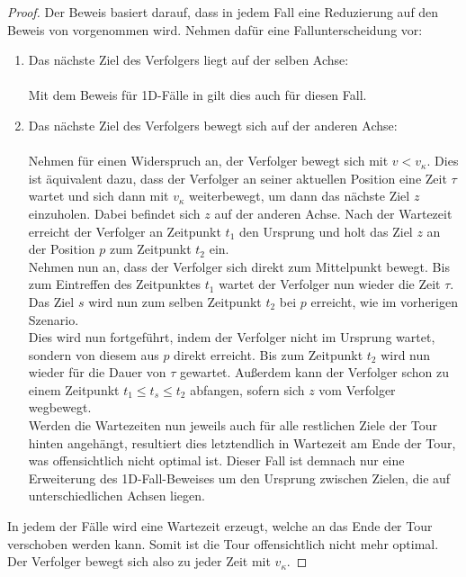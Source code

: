 \documentclass[german,version-2019-11]{uzl-thesis}
\begin{document}
\begin{proof}
Der Beweis basiert darauf, dass in jedem Fall eine Reduzierung auf den Beweis von \cite{helvig} vorgenommen wird. Nehmen dafür eine Fallunterscheidung vor:
\begin{enumerate}
\item Das nächste Ziel des Verfolgers liegt auf der selben Achse: \\\\
\noindent
Mit dem Beweis für 1D-Fälle in \cite{helvig} gilt dies auch für diesen Fall.\\

\item Das nächste Ziel des Verfolgers bewegt sich auf der anderen Achse: \\\\
\noindent
Nehmen für einen Widerspruch an, der Verfolger bewegt sich mit $v < v_{\kappa}$. Dies ist äquivalent dazu, dass der Verfolger an seiner aktuellen Position eine Zeit $\tau$ wartet und sich dann mit $v_{\kappa}$ weiterbewegt, um dann das nächste Ziel $z$ einzuholen. Dabei befindet sich $z$ auf der anderen Achse. Nach der Wartezeit erreicht der Verfolger an Zeitpunkt $t_1$ den Ursprung und holt das Ziel $z$ an der Position $p$ zum Zeitpunkt $t_2$ ein. \\
Nehmen nun an, dass der Verfolger sich direkt zum Mittelpunkt bewegt. Bis zum Eintreffen des Zeitpunktes $t_1$ wartet der Verfolger nun wieder die Zeit $\tau$. Das Ziel $s$ wird nun zum selben Zeitpunkt $t_2$ bei $p$ erreicht, wie im vorherigen Szenario. \\
Dies wird nun fortgeführt, indem der Verfolger nicht im Ursprung wartet, sondern von diesem aus $p$ direkt erreicht. Bis zum Zeitpunkt $t_2$ wird nun wieder für die Dauer von $\tau$ gewartet. Außerdem kann der Verfolger schon zu einem Zeitpunkt $t_1 \leq t_{s} \leq t_2$ abfangen, sofern sich $z$ vom Verfolger wegbewegt. \\
Werden die Wartezeiten nun jeweils auch für alle restlichen Ziele der Tour hinten angehängt, resultiert dies letztendlich in Wartezeit am Ende der Tour, was offensichtlich nicht optimal ist. Dieser Fall ist demnach nur eine Erweiterung des 1D-Fall-Beweises um den Ursprung zwischen Zielen, die auf unterschiedlichen Achsen liegen. 
\end{enumerate}\noindent
In jedem der Fälle wird eine Wartezeit erzeugt, welche an das Ende der Tour \\verschoben werden kann. Somit ist die Tour offensichtlich nicht mehr optimal. Der Verfolger bewegt sich also zu jeder Zeit mit $v_{\kappa}$.
\end{proof}
\end{document}
